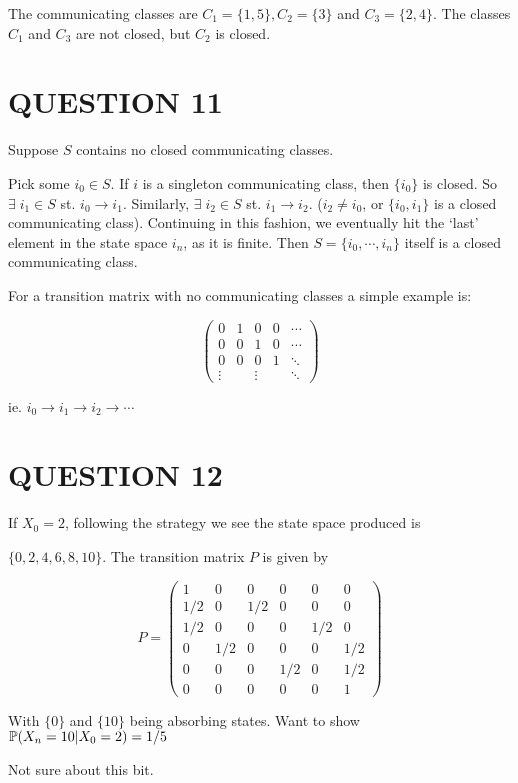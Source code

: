 \documentclass[a4paper]{article}
\begin{document}
The communicating classes are $ C_{1} = \{ 1,5 \}, C_{2} = \{ 3 \} $ and $ C_{3} = \{ 2,4 \} $. The classes $ C_{1} $ and $ C_{3} $ are not closed, but $ C_{2} $ is closed.

\section{QUESTION 11}

Suppose $ S $ contains no closed communicating classes. 

Pick some $ i_{0} \in S $. If $ i $ is a singleton communicating class, then $ \{i_{0} \} $ is closed. So $ \exists \; i_{1} \in S $ st. $ i_{0} \to i_{1} $. Similarly, $ \exists \; i_{2} \in S $ st. $ i_{1} \to i_{2} $. ($ i_{2} \neq i_{0} $, or $ \{i_{0},i_{1}\} $ is a closed communicating class). Continuing in this fashion, we eventually hit the `last' element in the state space $ i_{n} $, as it is finite. Then $ S = \{ i_{0},\cdots,i_{n} \} $ itself is a closed communicating class.

For a transition matrix with no communicating classes a simple example is:

\[ \begin{pmatrix}
0 & 1 & 0 & 0 &\cdots \\
0 & 0 & 1 & 0 & \cdots \\
0 & 0 & 0 & 1 & \ddots \\
\vdots &&\vdots && \ddots 
\end{pmatrix} \]

ie. $ i_{0} \to i_{1} \to i_{2} \to \cdots $


\section{QUESTION 12}

If $ X_{0} = 2 $, following the strategy we see the state space produced is 

$ \{  0,2,4,6,8,10 \} $. The transition matrix $ P $ is given by


\[ P = \begin{pmatrix}
1 & 0 & 0 & 0 & 0 & 0\\
1/2 & 0 & 1/2 & 0 & 0 & 0 \\
1/2 & 0 & 0 & 0 & 1/2 & 0 \\
0 & 1/2 & 0 & 0 & 0 & 1/2\\
0 & 0 & 0 & 1/2 & 0 & 1/2 \\
0 & 0 & 0 & 0 & 0 & 1

\end{pmatrix} \]

With $ \{0\} $ and $ \{10\} $ being absorbing states.
Want to show $ \P (  X_{n} = 10 | X_{0} = 2 ) = 1/5  $

Not sure about this bit.
\end{document}
